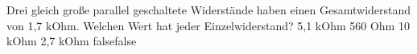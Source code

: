     {Drei gleich große parallel geschaltete Widerstände haben einen Gesamtwiderstand von 1,7 kOhm. Welchen Wert hat jeder Einzelwiderstand?}
    {5,1 kOhm}
    {560 Ohm}
    {10 kOhm}
    {2,7 kOhm}
    {false}{false}